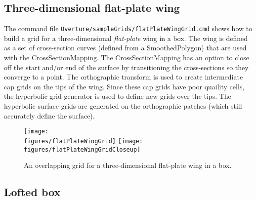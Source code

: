 \documentclass[xcolor=rgb,svgnames,dvipsnames]{article}
\newcommand{\figures}{\homeHenshaw/OvertureFigures}
\begin{document}


\clearpage
\subsection{Three-dimensional flat-plate wing}\label{sec:FlatPlateWing}

The command file {\tt Overture/sampleGrids/flatPlateWingGrid.cmd} shows how to build a grid 
for a three-dimensional {\em flat-plate} wing in a box. The wing is defined as a set of 
cross-section curves (defined from a SmoothedPolygon)
that are used with the CrossSectionMapping. The CrossSectionMapping has an option to 
close off the start and/or end of the surface by transitioning the cross-sections
so they converge to a point. The orthographic transform is used to create intermediate cap grids on
the tips of the wing. Since these cap grids have poor quaility cells, the hyperbolic grid generator
is used to define new grids over the tips. The hyperbolic surface grids are generated on the orthographic patches (which still
accurately define the surface).

\begin{figure}[htb]
  \begin{center}
   \texttt{[image: \\figures/flatPlateWingGrid]}
   \texttt{[image: \\figures/flatPlateWingGridCloseup]}
  \caption{An overlapping grid for a three-dimensional flat-plate wing in a box. } \label{fig:flatPlateWingGrid}
  \end{center}
\end{figure}


\subsection{Lofted box}\label{sec:LoftedBox}
\end{document}
